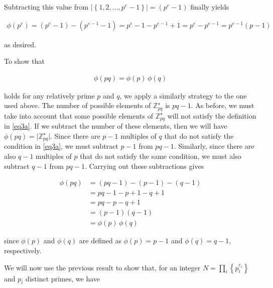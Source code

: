 \documentclass{article}[12]
\numberwithin{equation}{section}
\newcommand{\Z}{\mathbb{Z}}
\begin{document}
\begin{flushleft}
Subtracting this value from $\lvert \left\{ 1, 2, \dots, p^e - 1 \right\} \rvert = \left(p^e - 1\right)$ finally yields

\begin{align*}
  \phi \left( p^e \right) = \left(p^e - 1\right) - \left(p^{e-1} - 1\right) = p^e - 1 - p^{e-1} + 1 = p^e - p^{e-1} = p^{e-1} \left( p - 1 \right)
\end{align*}

as desired. \newline

To show that

\begin{align*}
  \phi \left( p q \right) = \phi \left( p \right) \, \phi \left( q \right)
\end{align*} 

holds for any relatively prime $p$ and $q$, we apply a similarly strategy to the one used above.  The number of possible elements of $\Z_{pq}^\star$ is $pq - 1$.  As before, we must take into account that some possible elements of $\Z_{pq}^\star$ will not satisfy the definition in \ref{eq3a}.  If we subtract the number of these elements, then we will have $\phi \left( p q \right) = \lvert \Z_{pq}^\star \rvert$.  Since there are $p - 1$ multiples of $q$ that do not satisfy the condition in \ref{eq3a}, we must subtract $p - 1$ from $pq - 1$.  Similarly, since there are also $q - 1$ multiples of $p$ that do not satisfy the same condition, we must also subtract $q - 1$ from $pq - 1$.  Carrying out these subtractions gives 

\begin{align*}
  \phi \left( p q \right) &= \left( p q - 1 \right) - \left( p - 1 \right) - \left( q - 1 \right) \\
  &= pq - 1 - p + 1 - q + 1 \\
  &= pq - p - q + 1 \\
  &= \left( p - 1 \right) \left( q - 1 \right) \\
  &= \phi \left( p \right) \, \phi \left( q \right)
\end{align*}

since $\phi \left( p \right)$ and $\phi \left( q \right)$ are defined as $\phi \left( p \right) = p - 1$ and $\phi \left( q \right) = q - 1$, respectively. \newline

We will now use the previous result to show that, for an integer $N = \prod_i \left\{ p_i^{e_i} \right\}$ and $p_i$ distinct primes, we have


\end{flushleft}
\end{document}
